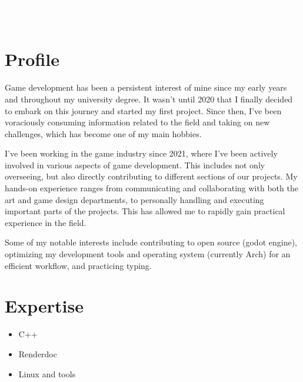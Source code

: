 \documentclass[9pt,oneside,a4paper,titlepage]{article}
\date{}
\begin{document}

\begin{tcolorbox}
	\vspace*{0.5cm}
	\begin{minipage}{1.0\textwidth}
		\begin{center}
			\Huge{\textcolor{white}{JOAN DOT SASTRE}} \\
			\vspace*{0.5cm}
			\Large{\textcolor{white}{Graphics programmer}}
		\end{center}
	\end{minipage}
	\vspace*{0.5cm}
\end{tcolorbox}
\begin{tcolorbox}
	\begin{minipage}[t]{8cm}
		\vspace*{-0.5cm}
		\begin{tcolorbox}[grow to left by=0.6cm,colback=gray!25,colframe=white,height fill]
			\section*{Profile}
			Game development has been a persistent interest of mine since my early years and throughout my university degree. It wasn’t until 2020 that I finally decided to embark on this journey and started
			my first project. Since then, I’ve been voraciously consuming information related to the field and taking on new challenges, which has become one of my main hobbies.

			I’ve been working in the game industry since
			2021, where I’ve been actively involved in various aspects of game development. This includes not only overseeing, but also directly contributing to different sections of our projects. My hands-on experience ranges from communicating and collaborating with both the art and game design departments, to personally handling and
			executing important parts of the projects. This
			has allowed me to rapidly gain practical
			experience in the field.

			Some of my notable interests include contributing to open source (godot engine), optimizing my development tools and operating system (currently Arch) for an efficient workflow, and practicing typing.
			\section*{Expertise}
			\begin{itemize}
				\item{C++}
				\item{Renderdoc}
				\item{Linux and tools}
			\end{itemize}

\end{tcolorbox}
\end{minipage}
\end{tcolorbox}
\end{document}
